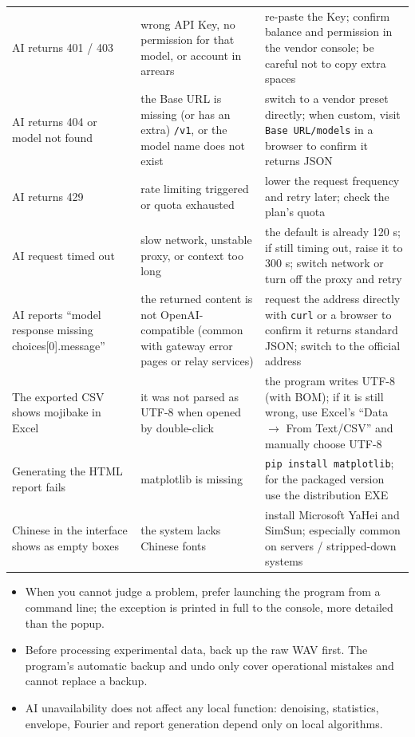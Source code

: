 \documentclass[UTF8,a4paper,12pt]{ctexart}
\begin{document}
{\begin{longtable}{@{}>{\raggedright\arraybackslash}p{}>{\raggedright\arraybackslash}p{}>{\raggedright\arraybackslash}p{}@{}}
AI returns 401 / 403 & wrong API Key, no permission for that model, or account in arrears & re-paste the Key; confirm balance and permission in the vendor console; be careful not to copy extra spaces \\
AI returns 404 or model not found & the Base URL is missing (or has an extra) \texttt{/v1}, or the model name does not exist & switch to a vendor preset directly; when custom, visit \texttt{Base URL/models} in a browser to confirm it returns JSON \\
AI returns 429 & rate limiting triggered or quota exhausted & lower the request frequency and retry later; check the plan's quota \\
AI request timed out & slow network, unstable proxy, or context too long & the default is already 120 s; if still timing out, raise it to 300 s; switch network or turn off the proxy and retry \\
AI reports ``model response missing choices[0].message'' & the returned content is not OpenAI-compatible (common with gateway error pages or relay services) & request the address directly with \texttt{curl} or a browser to confirm it returns standard JSON; switch to the official address \\
The exported CSV shows mojibake in Excel & it was not parsed as UTF-8 when opened by double-click & the program writes UTF-8 (with BOM); if it is still wrong, use Excel's ``Data $\to$ From Text/CSV'' and manually choose UTF-8 \\
Generating the HTML report fails & matplotlib is missing & \texttt{pip install matplotlib}; for the packaged version use the distribution EXE \\
Chinese in the interface shows as empty boxes & the system lacks Chinese fonts & install Microsoft YaHei and SimSun; especially common on servers / stripped-down systems \\
\end{longtable}
}

\begin{itemize}
  \item When you cannot judge a problem, prefer launching the program from a command line; the exception is printed in full to the console, more detailed than the popup.
  \item Before processing experimental data, back up the raw WAV first. The program's automatic backup and undo only cover operational mistakes and cannot replace a backup.
  \item AI unavailability does not affect any local function: denoising, statistics, envelope, Fourier and report generation depend only on local algorithms.
\end{itemize}
\end{document}
